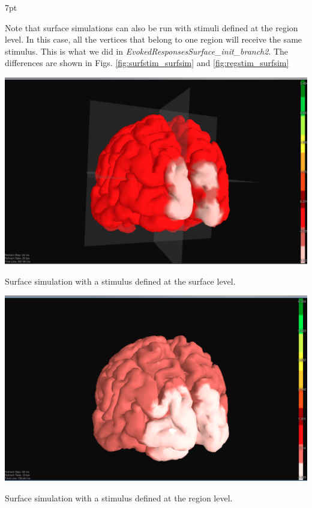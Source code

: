 \documentclass{tufte-handout}
\newenvironment{blah}{%
  \def\FrameCommand{%
    \hspace{1pt}%
    {\color{DarkOrange}\vrule width 2pt}%
    {\color{PeachPuff}\vrule width 4pt}%
    \colorbox{PeachPuff}%
  }%
  \MakeFramed{\advance\hsize-\width\FrameRestore}%
  \noindent\hspace{-4.55pt}%
  \begin{adjustwidth}{}{7pt}%
  \vspace{2pt}\vspace{2pt}%
}
{%
  \vspace{2pt}\end{adjustwidth}\endMakeFramed%
}
\begin{document}
 
\begin{blah}
Note that surface simulations can also be run with stimuli defined at the
region level. In this case, all the vertices that belong to one region will
receive the same stimulus. This is what we did in \textit{EvokedResponsesSurface\_init\_branch2}. The differences are shown in Figs. \ref{fig:surfstim_surfsim} and \ref{fig:regstim_surfsim}
\end{blah}

\begin{marginfigure}
  \includegraphics[width=\linewidth]{Handout_UI_HeterogenousModelAndStimulation_SurfaceStimSurfaceSim.png}%
  \caption{Surface simulation with a stimulus defined at the surface level.}%
  \label{fig:surfstim_surfsim}%
\end{marginfigure}

\begin{marginfigure}
  \includegraphics[width=\linewidth]{Handout_UI_HeterogenousModelAndStimulation_RegionStimSurfaceSim.png}%
  \caption{Surface simulation with a stimulus defined at the region level.}%
  \label{fig:regstim_surfsim}%
\end{marginfigure}
\end{document}
